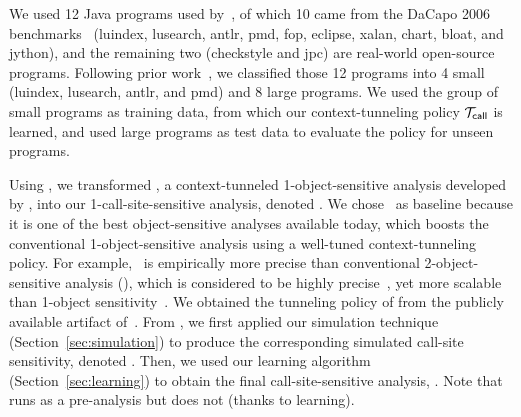 We used 12 Java programs used by~\cite{JeJeOh18}, of which 10 came from the DaCapo 2006
benchmarks~\cite{Blackburn2006} ({luindex}, {lusearch}, {antlr},
{pmd}, {fop}, {eclipse}, {xalan}, {chart}, {bloat}, and {jython}), and
the remaining two ({checkstyle} and {jpc}) are real-world open-source programs.
Following prior work~\cite{JeJeOh18,Smaragdakis2014}, we classified those 12
programs into 4 small (luindex, lusearch, antlr, and pmd) and 8 large
programs. 
We used the group of small programs as training data, 
from which our context-tunneling policy $\mathcal{T}_{{\sf call}}$ is learned, 
and used large programs as test data to evaluate the
policy for unseen programs.


%




Using \ourtechnique, we transformed \oneobjHT, a context-tunneled
1-object-sensitive analysis developed by \cite{JeJeOh18}, into our
1-call-site-sensitive analysis, denoted \ours.  We chose
\oneobjHT~as baseline because it is one of the best object-sensitive analyses
available today, which boosts the conventional 1-object-sensitive
analysis using a well-tuned context-tunneling policy. For
example, \oneobjHT~is empirically more precise than conventional
2-object-sensitive analysis (\twoobjH), which is considered to be highly
precise~\cite{JeJeChOh17,Li2018a,Li2018b,Smaragdakis2014,Graphick20}, yet more
scalable than 1-object sensitivity~\cite{JeJeOh18}.  We obtained the
tunneling policy of {\oneobjHT} from the publicly available artifact
of~\cite{JeJeOh18}.
From {\oneobjHT}, we first applied our simulation
  technique (Section~\ref{sec:simulation}) to produce
  the corresponding simulated call-site sensitivity, denoted \oursim. Then, we
  used our learning algorithm (Section~\ref{sec:learning}) to obtain the final 
   call-site-sensitive analysis, \ours. 
Note that {\oursim} runs {\oneobjHT} as a pre-analysis but {\ours} does not (thanks to learning). 

